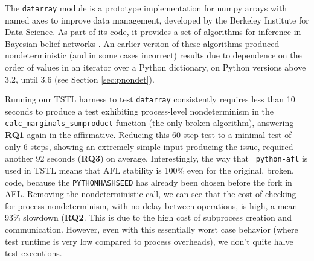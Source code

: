 {

The {\tt datarray} module \cite{datarray} is a prototype
implementation for numpy arrays with named axes to improve data
management, developed by the Berkeley Institute for Data Science.  As part of its code, it provides a set of algorithms for
inference in
Bayesian belief networks \cite{russell2016artificial}.  An earlier
version of these algorithms produced nondeterministic (and in some
cases incorrect) results due to dependence on the order of values in
an iterator over a Python dictionary, on Python versions above 3.2,
until 3.6 (see Section \ref{sec:pnondet}).  

Running our TSTL
harness to test {\tt datarray} consistently requires less than 10 seconds to produce a test exhibiting process-level nondeterminism in
the {\tt calc\_marginals\_sumproduct} function (the only broken
algorithm), answering {\bf RQ1} again in the affirmative.  Reducing this 60 step test to a minimal test of only 6 steps,
showing an extremely simple input producing the issue, 
required another 92 seconds ({\bf RQ3}) on average.  Interestingly, the way that {\tt
  python-afl} is used in TSTL means that AFL stability is 100\% even
for the original, broken, code,
because the {\tt PYTHONHASHSEED} has already been chosen before the
fork in AFL.  Removing the nondeterministic call, we can see that the cost of
checking for process nondeterminism, with no delay between operations,
is high, a mean 93\% slowdown ({\bf RQ2}.  This is due to the high cost of subprocess
creation and communication. However, even with this essentially worst
case behavior (where test runtime is very low compared to process overheads),
we don't quite halve test executions.

}
